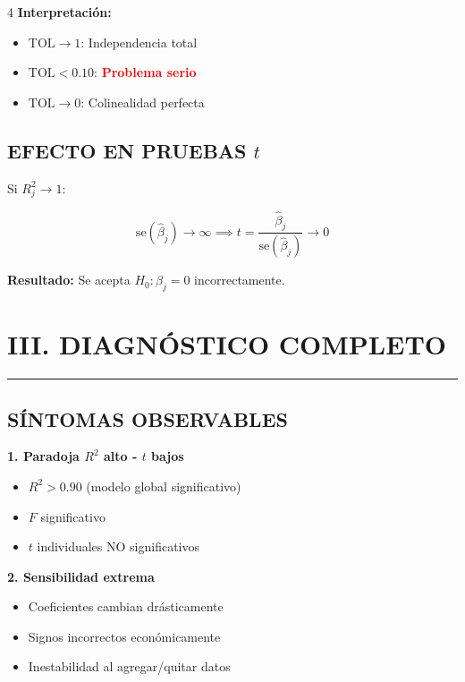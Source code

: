 \documentclass[6pt, landscape]{extarticle}
\newcommand{\sectionline}{%
  \nopagebreak\vspace{-4pt}\noindent\textcolor{GoldLeaf}{\rule{\linewidth}{1pt}}\par\vspace{2pt}%
}
\newcommand{\TOL}{\text{TOL}}
\begin{document}
\begin{multicols*}{4}
\textbf{Interpretación:}
\begin{itemize}
    \item $\TOL \to 1$: Independencia total
    \item $\TOL < 0.10$: \textcolor{red}{\textbf{Problema serio}}
    \item $\TOL \to 0$: Colinealidad perfecta
\end{itemize}

\subsection{EFECTO EN PRUEBAS $t$}

Si $R_j^2 \to 1$:
\begin{formulabox}
\vspace{-3pt}
$$\text{se}(\hat{\beta}_j) \to \infty \implies t = \frac{\hat{\beta}_j}{\text{se}(\hat{\beta}_j)} \to 0$$
\vspace{-3pt}
\end{formulabox}

\textbf{Resultado:} Se acepta $H_0: \beta_j = 0$ incorrectamente.


\section{III. DIAGNÓSTICO COMPLETO}
\sectionline

\subsection{SÍNTOMAS OBSERVABLES}

\textbf{1. Paradoja $R^2$ alto - $t$ bajos}
\begin{itemize}
    \item $R^2 > 0.90$ (modelo global significativo)
    \item $F$ significativo
    \item $t$ individuales NO significativos
\end{itemize}

\textbf{2. Sensibilidad extrema}
\begin{itemize}
    \item Coeficientes cambian drásticamente
    \item Signos incorrectos económicamente
    \item Inestabilidad al agregar/quitar datos
\end{itemize}


\end{multicols*}
\end{document}
